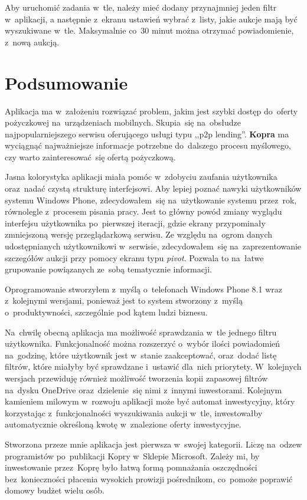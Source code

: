 \documentclass[a4paper,twoside,titlepage,openright]{book}
\begin{document}
Aby uruchomić zadania w~tle, należy mieć dodany przynajmniej jeden filtr w~aplikacji, a następnie z~ekranu ustawień wybrać z~listy, jakie aukcje mają być wyszukiwane w~tle. Maksymalnie co~30 minut można otrzymać powiadomienie, z~nową aukcją.

 
\chapter{Podsumowanie}
Aplikacja ma w~założeniu rozwiązać problem, jakim jest szybki dostęp do~oferty pożyczkowej na~urządzeniach mobilnych. Skupia~się na~obsłudze najpopularniejszego serwisu oferującego usługi typu ,,p2p lending''. \textbf{Kopra} ma wyciągnąć najważniejsze informacje potrzebne do~dalszego procesu myślowego, czy warto zainteresować~się ofertą pożyczkową. 

Jasna kolorystyka aplikacji miała pomóc w~zdobyciu zaufania użytkownika oraz~nadać czystą strukturę interfejsowi. Aby lepiej poznać nawyki użytkowników systemu Windows Phone, zdecydowałem~się na~użytkowanie systemu przez~rok, równolegle z~procesem pisania pracy. Jest to główny powód zmiany wyglądu interfejsu użytkownika po~pierwszej iteracji, gdzie ekrany przypominały zmniejszoną wersję przeglądarkową serwisu. Ze względu na~ogrom danych udostępnianych użytkownikowi w~serwisie, zdecydowałem~się na~zaprezentowanie szczegółów aukcji przy pomocy ekranu typu \textit{pivot}. Pozwala to na~łatwe grupowanie powiązanych ze~sobą tematycznie informacji. 

Oprogramowanie stworzyłem z~myślą o~telefonach Windows Phone 8.1 wraz z~kolejnymi wersjami, ponieważ jest to system stworzony z~myślą o~produktywności, szczególnie pod kątem ludzi biznesu.

Na~chwilę obecną aplikacja ma możliwość sprawdzania w~tle jednego filtru użytkownika. Funkcjonalność można rozszerzyć o~wybór ilości powiadomień na~godzinę, które użytkownik jest w~stanie zaakceptować, oraz~dodać listę filtrów, które miałyby być sprawdzane i~ustawić dla~nich priorytety. W~kolejnych wersjach przewiduję również możliwość tworzenia kopii zapasowej filtrów na~dysku OneDrive oraz~dzielenie~się nimi z~innymi inwestorami. Kolejnym kamieniem milowym w~rozwoju aplikacji może być automat inwestycyjny, który korzystając z~funkcjonalności wyszukiwania aukcji w~tle, inwestowałby automatycznie określoną kwotę w~znalezione oferty inwestycyjne.

Stworzona przeze mnie aplikacja jest pierwsza w~swojej kategorii. Liczę na~odzew programistów po~publikacji Kopry w~Sklepie Microsoft. Zależy mi, by inwestowanie przez~Koprę było łatwą formą pomnażania oszczędności bez~konieczności płacenia wysokich prowizji pośrednikom, co~pomoże poprawić domowy budżet wielu osób.
 
\end{document}
